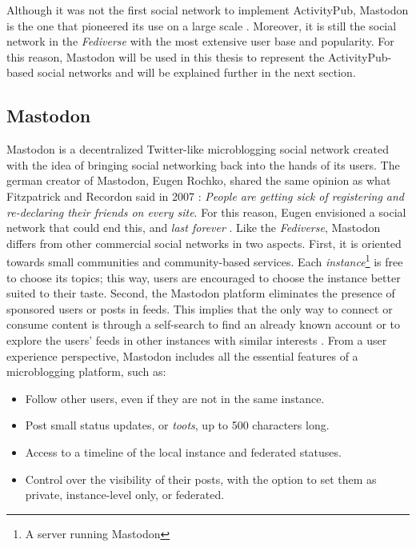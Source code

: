 Although it was not the first social network to implement ActivityPub, Mastodon is the one that pioneered its use on a large scale \cite{lemmer-webber_2017}. Moreover, it is still the social network in the \emph{Fediverse} with the most extensive user base and popularity. For this reason, Mastodon will be used in this thesis to represent the ActivityPub-based social networks and will be explained further in the next section. 

\subsection{Mastodon}\label{subsec:mastodon}

 Mastodon is a decentralized Twitter-like microblogging social network created with the idea of bringing social networking back into the hands of its users. The german creator of Mastodon, Eugen Rochko, shared the same opinion as what Fitzpatrick and Recordon said in 2007 \cite{fitzpatrick_recordon_2007}: \emph{People are getting sick of registering and re-declaring their friends on every site}. For this reason, Eugen envisioned a social network that could end this, and \emph{last forever} \cite{tilley_2018}. Like the \emph{Fediverse}, Mastodon differs from other commercial social networks in two aspects. First, it is oriented towards small communities and community-based services. Each \emph{instance}\footnote{A server running Mastodon} is free to choose its topics; this way, users are encouraged to choose the instance better suited to their taste. Second, the Mastodon platform eliminates the presence of sponsored users or posts in feeds. This implies that the only way to connect or consume content is through a self-search to find an already known account or to explore the users' feeds in other instances with similar interests \cite{8845221}. From a user experience perspective, Mastodon includes all the essential features of a microblogging platform, such as:

\begin{itemize}
  \item Follow other users, even if they are not in the same instance. 
  \item Post small status updates, or \emph{toots}, up to 500 characters long. 
  \item Access to a timeline of the local instance and federated statuses. 
  \item Control over the visibility of their posts, with the option to set them as private, instance-level only, or federated. 
\end{itemize}

